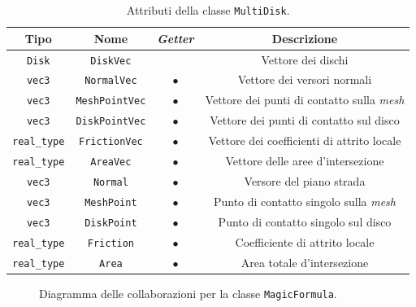 \begin{table}[h!]
	\centering
	\begin{tabular}{|c|c|c|c|}
		\hline 
		\textbf{Tipo} & \textbf{Nome} & \textit{\textbf{Getter}} & \textbf{Descrizione} \\ \hline 
		\texttt{Disk} & \texttt{DiskVec} &  & Vettore dei dischi \\ \hline 
		\texttt{vec3} & \texttt{NormalVec} & $\bullet$ & Vettore dei versori normali \\ \hline
		\texttt{vec3} & \texttt{MeshPointVec} & $\bullet$ & Vettore dei punti di contatto sulla \textit{mesh} \\ \hline
		\texttt{vec3} & \texttt{DiskPointVec} & $\bullet$ & Vettore dei punti di contatto sul disco \\ \hline
		\texttt{real\_type} & \texttt{FrictionVec} & $\bullet$ & Vettore dei coefficienti di attrito locale \\ \hline
		\texttt{real\_type} & \texttt{AreaVec} & $\bullet$ & Vettore delle aree d'intersezione \\ \hline
		\texttt{vec3} & \texttt{Normal} & $\bullet$ & Versore del piano strada \\ \hline
		\texttt{vec3} & \texttt{MeshPoint} & $\bullet$ & Punto di contatto singolo sulla \textit{mesh} \\ \hline
		\texttt{vec3} & \texttt{DiskPoint} & $\bullet$ & Punto di contatto singolo sul disco \\ \hline
		\texttt{real\_type} & \texttt{Friction} & $\bullet$ & Coefficiente di attrito locale \\ \hline
		\texttt{real\_type} & \texttt{Area} & $\bullet$ & Area totale d'intersezione \\ \hline
	\end{tabular}
	\caption{Attributi della classe \texttt{MultiDisk}.}
	\label{}
\end{table}
%
\begin{figure}[h!]
	\centering
	\caption{Diagramma delle collaborazioni per la classe \texttt{MagicFormula}.}
\end{figure}
